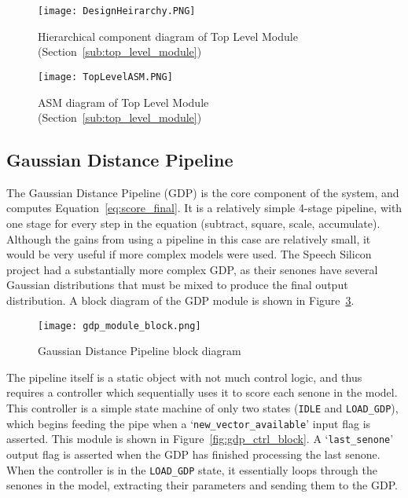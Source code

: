		\begin{figure}[tb]
			\begin{center}
				\texttt{[image: DesignHeirarchy.PNG]}
			\end{center}
			\caption{Hierarchical component diagram of Top Level Module (Section~\ref{sub:top_level_module})}
			\label{fig:toplevel}
		\end{figure}

		\begin{figure}[tb]
			\begin{center}
				\texttt{[image: TopLevelASM.PNG]}
			\end{center}
			\caption{ASM diagram of Top Level Module (Section~\ref{sub:top_level_module})}
			\label{fig:topstatemachine}
		\end{figure}

	\subsection{Gaussian Distance Pipeline} %
	\label{sub:gaussian_distance_pipeline}
		The Gaussian Distance Pipeline (GDP) is the core component of the system, and computes Equation~\ref{eq:score_final}.  It is a relatively simple 4-stage pipeline, with one stage for every step in the equation (subtract, square, scale, accumulate).  Although the gains from using a pipeline in this case are relatively small, it would be very useful if more complex models were used.  The Speech Silicon \cite{schuster2006speech} project had a substantially more complex GDP, as their senones have several Gaussian distributions that must be mixed to produce the final output distribution.  A block diagram of the GDP module is shown in Figure~\ref{fig:gdp_block}.  %

		\begin{figure}[tb]
			\begin{center}
				\texttt{[image: gdp\_module\_block.png]}
			\end{center}
			\caption{Gaussian Distance Pipeline block diagram}
			\label{fig:gdp_block}
		\end{figure}

		The pipeline itself is a static object with not much control logic, and thus requires a controller which sequentially uses it to score each senone in the model.  This controller is a simple state machine of only two states (\texttt{IDLE} and \texttt{LOAD\_GDP}), which begins feeding the pipe when a `\texttt{new\_vector\_available}' input flag is asserted.  This module is shown in Figure~\ref{fig:gdp_ctrl_block}.  A `\texttt{last\_senone}' output flag is asserted when the GDP has finished processing the last senone.  When the controller is in the \texttt{LOAD\_GDP} state, it essentially loops through the senones in the model, extracting their parameters and sending them to the GDP.  

